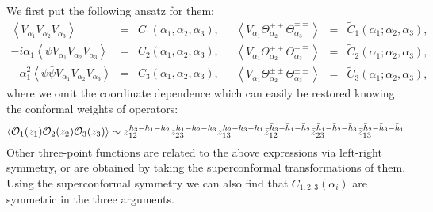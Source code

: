 \documentclass[a4paper,12pt]{article}
\newcommand{\vev}[1]{\left<{#1}\right>}
\begin{document}
   We first put the following ansatz for them:
\begin{equation}
\begin{array}{rcl}
  \vev{V_{\alpha_1}V_{\alpha_2}V_{\alpha_3}}
 &=& C_1(\alpha_1,\alpha_2,\alpha_3), \\
  -i\alpha_1\vev{\psi V_{\alpha_1}V_{\alpha_2}V_{\alpha_3}}
 &=& C_2(\alpha_1,\alpha_2,\alpha_3), \\
  -\alpha_1^2\vev{\psi\bar{\psi}V_{\alpha_1}V_{\alpha_2}V_{\alpha_3}}
 &=& C_3(\alpha_1,\alpha_2,\alpha_3),
\end{array}
~~~
\begin{array}{rcl}
  \vev{V_{\alpha_1}
       \Theta_{\alpha_2}^{\pm\pm}
       \Theta_{\alpha_3}^{\mp\mp}}
 &=& \tilde{C}_1(\alpha_1;\alpha_2,\alpha_3), \\
  \vev{V_{\alpha_1}
       \Theta_{\alpha_2}^{\pm\pm}
       \Theta_{\alpha_3}^{\pm\mp}}
 &=& \tilde{C}_2(\alpha_1;\alpha_2,\alpha_3), \\
  \vev{V_{\alpha_1}
       \Theta_{\alpha_2}^{\pm\pm}
       \Theta_{\alpha_3}^{\pm\pm}}
 &=& \tilde{C}_3(\alpha_1;\alpha_2,\alpha_3),
\end{array}
\end{equation}
 where we omit the coordinate dependence which can easily be restored
 knowing the conformal weights of operators:
\begin{equation}
  \vev{{\cal O}_1(z_1){\cal O}_2(z_2){\cal O}_3(z_3)}
 \sim z_{12}^{h_3-h_1-h_2}
      z_{23}^{h_1-h_2-h_3}
      z_{13}^{h_2-h_3-h_1}
      \bar{z}_{12}^{\bar{h}_3-\bar{h}_1-\bar{h}_2}
      \bar{z}_{23}^{\bar{h}_1-\bar{h}_2-\bar{h}_3}
      \bar{z}_{13}^{\bar{h}_2-\bar{h}_3-\bar{h}_1}
\end{equation}
 Other three-point functions are related to the above expressions
 via left-right symmetry, or are obtained by taking the
 superconformal transformations of them.
 Using the superconformal symmetry we can also find that
 $C_{1,2,3}(\alpha_i)$ are symmetric in the three arguments.
\end{document}
